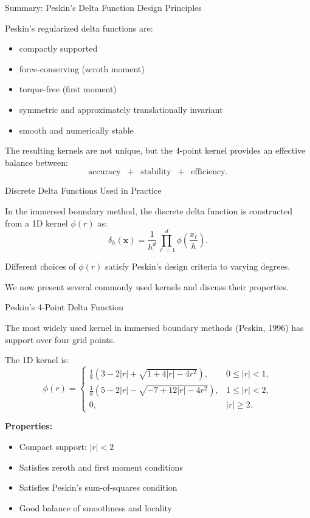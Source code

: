 \documentclass{beamer}
\begin{document}
\begin{frame}{Summary: Peskin’s Delta Function Design Principles}

Peskin’s regularized delta functions are:
\begin{itemize}
    \item compactly supported
    \item force-conserving (zeroth moment)
    \item torque-free (first moment)
    \item symmetric and approximately translationally invariant
    \item smooth and numerically stable
\end{itemize}

\medskip

The resulting kernels are not unique, but the 4-point kernel
provides an effective balance between:
\[
\text{accuracy} \;\;+\;\; \text{stability} \;\;+\;\; \text{efficiency}.
\]

\end{frame}

\begin{frame}{Discrete Delta Functions Used in Practice}

In the immersed boundary method, the discrete delta function
is constructed from a 1D kernel $\phi(r)$ as:
\[
\delta_h(\mathbf{x})
=
\frac{1}{h^d}
\prod_{\ell=1}^{d}
\phi\!\left(\frac{x_\ell}{h}\right).
\]

\medskip

Different choices of $\phi(r)$ satisfy Peskin’s design criteria
to varying degrees.

\medskip

We now present several commonly used kernels and discuss their properties.

\end{frame}

\begin{frame}{Peskin’s 4-Point Delta Function}

The most widely used kernel in immersed boundary methods
(Peskin, 1996) has support over four grid points.

\medskip

The 1D kernel is:
\[
\phi(r)
=
\begin{cases}
\frac{1}{8}
\left(
3 - 2|r| + \sqrt{1 + 4|r| - 4r^2}
\right),
& 0 \le |r| < 1, \\[6pt]
\frac{1}{8}
\left(
5 - 2|r| - \sqrt{-7 + 12|r| - 4r^2}
\right),
& 1 \le |r| < 2, \\[6pt]
0,
& |r| \ge 2.
\end{cases}
\]

\medskip

\textbf{Properties:}
\begin{itemize}
    \item Compact support: $|r| < 2$
    \item Satisfies zeroth and first moment conditions
    \item Satisfies Peskin’s sum-of-squares condition
    \item Good balance of smoothness and locality
\end{itemize}

\end{frame}
\end{document}
